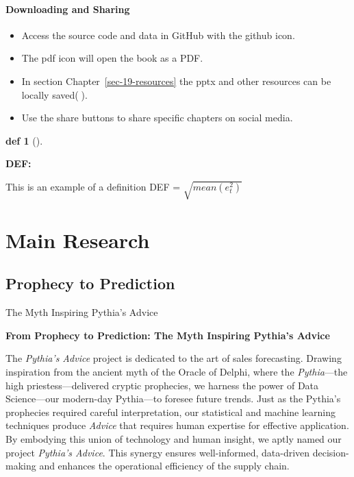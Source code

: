 \documentclass[
  american,
  10,
  a4paper,
]{book}
\providecommand{\tightlist}{%
  \setlength{\itemsep}{0pt}\setlength{\parskip}{0pt}}
\theoremstyle{definition}
\newtheorem{definition}{def}[chapter]
\theoremstyle{remark}
\begin{document}
\subsection{Downloading and Sharing}\label{downloading-and-sharing}

\begin{itemize}
\tightlist
\item
  Access the source code and data in GitHub with the github icon.
\item
  The pdf icon will open the book as a PDF.
\item
  In section Chapter~\ref{sec-19-resources} the pptx and other resources
  can be locally saved(💾).
\item
  Use the share buttons to share specific chapters on social media.
\end{itemize}

\begin{definition}[]\protect\hypertarget{def-EX-DEF}{}\label{def-EX-DEF}

\textbf{DEF:}

This is an example of a definition DEF = \(\sqrt{mean(e^2_t)}\)

\end{definition}

\part{Main Research}

\chapter{Prophecy to Prediction}\label{prophecy-to-prediction}

The Myth Inspiring Pythia's Advice

\hfill\break

\textbf{\hfill\break
From Prophecy to Prediction: The Myth Inspiring Pythia's Advice}

The \emph{Pythia's Advice} project is dedicated to the art of sales
forecasting. Drawing inspiration from the ancient myth of the Oracle of
Delphi, where the \emph{Pythia}---the high priestess---delivered cryptic
prophecies, we harness the power of Data Science---our modern-day
Pythia---to foresee future trends. Just as the Pythia's prophecies
required careful interpretation, our statistical and machine learning
techniques produce \emph{Advice} that requires human expertise for
effective application. By embodying this union of technology and human
insight, we aptly named our project \emph{Pythia's Advice}. This synergy
ensures well-informed, data-driven decision-making and enhances the
operational efficiency of the supply chain.
\end{document}
